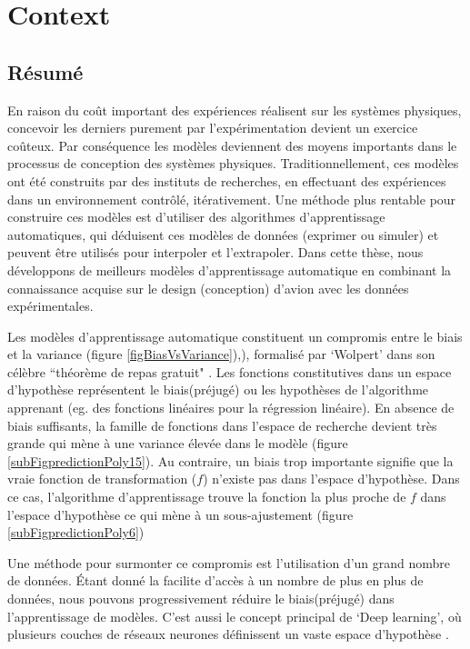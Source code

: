 \chapter{Context}
\label{chapIntroduction}

\begin{mdframed}[hidealllines=true,backgroundcolor=lightgray!20]
\section*{Résumé}
En raison du coût important des expériences réalisent sur les systèmes physiques, concevoir les derniers purement par l'expérimentation devient un exercice coûteux. Par conséquence les modèles deviennent des moyens importants dans le processus de conception des systèmes physiques. Traditionnellement, ces modèles ont été construits par des instituts de recherches, en effectuant des expériences dans un environnement contrôlé, itérativement. Une méthode plus rentable pour construire ces modèles est  d'utiliser des algorithmes d'apprentissage automatiques, qui déduisent ces modèles de données (exprimer ou simuler) et peuvent être utilisés pour interpoler et l'extrapoler. Dans cette thèse, nous développons de meilleurs modèles d'apprentissage automatique en combinant la connaissance acquise sur le design (conception) d'avion avec les données expérimentales.

Les modèles d'apprentissage automatique constituent un compromis entre le biais et la variance (figure \ref{figBiasVsVariance}),), formalisé par `Wolpert' dans son célèbre ``théorème de repas gratuit" \cite{wolpert1997no}. Les fonctions constitutives dans un espace d'hypothèse représentent le biais(préjugé) ou les hypothèses de l'algorithme apprenant (eg. des fonctions linéaires pour la régression linéaire). En absence de biais suffisants, la famille de fonctions dans l'espace de recherche devient très grande qui mène à une variance élevée dans le modèle (figure \ref{subFigpredictionPoly15}). Au contraire, un biais trop importante signifie que la vraie fonction de transformation ($f$) n'existe pas dans l'espace d'hypothèse. Dans ce cas, l'algorithme d'apprentissage trouve la fonction la plus proche de $f$ dans l'espace d'hypothèse ce qui mène à un sous-ajustement (figure \ref{subFigpredictionPoly6})

Une méthode pour surmonter ce compromis est l'utilisation d'un grand nombre de données. Étant donné la facilite d'accès à un nombre de plus en plus de données, nous pouvons progressivement réduire le biais(préjugé) dans l'apprentissage de modèles. C'est aussi le concept principal de `Deep learning', où plusieurs couches de réseaux neurones définissent un vaste espace d'hypothèse \cite{Goodfellow-et-al-2016, lecun2015deep}.


\end{mdframed}
